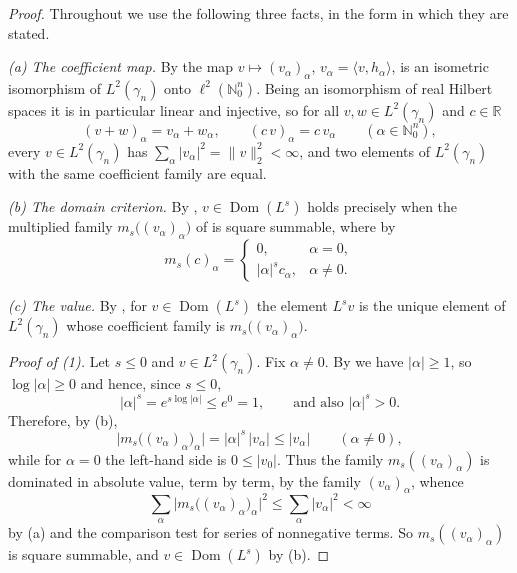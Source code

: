 \begin{proof}
Throughout we use the following three facts, in the form in which they are
stated.

\emph{(a) The coefficient map.}  By  the map
$v \mapsto (v_\alpha)_{\alpha}$, $v_\alpha = \langle v, h_\alpha\rangle$, is an
isometric isomorphism of $L^2(\gamma_n)$ onto $\ell^2(\mathbb{N}_0^n)$.  Being an
isomorphism of real Hilbert spaces it is in particular linear and injective, so
for all $v, w \in L^2(\gamma_n)$ and $c \in \mathbb{R}$
\[
  (v+w)_\alpha = v_\alpha + w_\alpha,
  \qquad (c\,v)_\alpha = c\,v_\alpha
  \qquad (\alpha \in \mathbb{N}_0^n),
\]
every $v \in L^2(\gamma_n)$ has $\sum_\alpha |v_\alpha|^2 = \|v\|_2^2 < \infty$,
and two elements of $L^2(\gamma_n)$ with the same coefficient family are equal.

\emph{(b) The domain criterion.}  By ,
$v \in \operatorname{Dom}(L^s)$ holds precisely when the multiplied family
$m_s\bigl((v_\alpha)_\alpha\bigr)$ of  is square summable,
where by 
\[
  m_s(c)_\alpha =
  \begin{cases} 0, & \alpha = 0, \\ |\alpha|^s c_\alpha, & \alpha \neq 0 .\end{cases}
\]

\emph{(c) The value.}  By , for $v \in \operatorname{Dom}(L^s)$
the element $L^s v$ is the unique element of $L^2(\gamma_n)$ whose coefficient
family is $m_s\bigl((v_\alpha)_\alpha\bigr)$.

\medskip
\emph{Proof of (1).}  Let $s \leq 0$ and $v \in L^2(\gamma_n)$.  Fix
$\alpha \neq 0$.  By  we have $|\alpha| \geq 1$, so
$\log|\alpha| \geq 0$ and hence, since $s \leq 0$,
\[
  |\alpha|^s = e^{s\log|\alpha|} \leq e^0 = 1 ,
  \qquad\text{and also } |\alpha|^s > 0 .
\]
Therefore, by (b),
\[
  \bigl|m_s\bigl((v_\alpha)_\alpha\bigr)_\alpha\bigr|
    = |\alpha|^{s}\,|v_\alpha| \leq |v_\alpha|
  \qquad (\alpha \neq 0),
\]
while for $\alpha = 0$ the left-hand side is $0 \leq |v_0|$.  Thus the family
$m_s((v_\alpha)_\alpha)$ is dominated in absolute value, term by term, by the
family $(v_\alpha)_\alpha$, whence
\[
  \sum_\alpha \bigl|m_s\bigl((v_\alpha)_\alpha\bigr)_\alpha\bigr|^2
    \leq \sum_\alpha |v_\alpha|^2 < \infty
\]
by (a) and the comparison test for series of nonnegative terms.  So
$m_s((v_\alpha)_\alpha)$ is square summable, and $v \in \operatorname{Dom}(L^s)$
by (b).


\end{proof}
